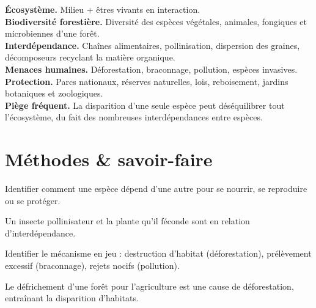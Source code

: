 \begin{synthese}
\textbf{Écosystème.} Milieu + êtres vivants en interaction.\\[4pt]
\textbf{Biodiversité forestière.} Diversité des espèces végétales, animales,
fongiques et microbiennes d'une forêt.\\[4pt]
\textbf{Interdépendance.} Chaînes alimentaires, pollinisation, dispersion des
graines, décomposeurs recyclant la matière organique.\\[4pt]
\textbf{Menaces humaines.} Déforestation, braconnage, pollution, espèces
invasives.\\[4pt]
\textbf{Protection.} Parcs nationaux, réserves naturelles, lois, reboisement,
jardins botaniques et zoologiques.\\[4pt]
\textbf{Piège fréquent.} La disparition d'une seule espèce peut déséquilibrer tout
l'écosystème, du fait des nombreuses interdépendances entre espèces.
\end{synthese}

\section{Méthodes \& savoir-faire}

Identifier comment une espèce dépend d'une autre pour se nourrir, se reproduire ou se
protéger.
\begin{exemple}
Un insecte pollinisateur et la plante qu'il féconde sont en relation
d'interdépendance.
\end{exemple}

Identifier le mécanisme en jeu : destruction d'habitat (déforestation), prélèvement
excessif (braconnage), rejets nocifs (pollution).
\begin{exemple}
Le défrichement d'une forêt pour l'agriculture est une cause de déforestation,
entraînant la disparition d'habitats.
\end{exemple}


